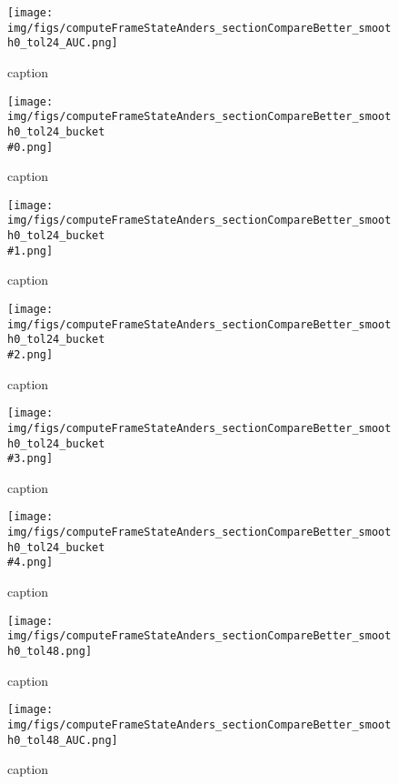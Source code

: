 %
\begin{figure}[!ht]
	\centering
	\texttt{[image: img/figs/computeFrameStateAnders\_sectionCompareBetter\_smooth0\_tol24\_AUC.png]}
	\caption{caption}
	\label{fig:computeFrameStateAnders_sectionCompareBetter_smooth0_tol24_AUC.png}
\end{figure}
%
\begin{figure}[!ht]
	\centering
	\texttt{[image: img/figs/computeFrameStateAnders\_sectionCompareBetter\_smooth0\_tol24\_bucket\\\#0.png]}
	\caption{caption}
	\label{fig:computeFrameStateAnders_sectionCompareBetter_smooth0_tol24_bucket\#0.png}
\end{figure}
%
\begin{figure}[!ht]
	\centering
	\texttt{[image: img/figs/computeFrameStateAnders\_sectionCompareBetter\_smooth0\_tol24\_bucket\\\#1.png]}
	\caption{caption}
	\label{fig:computeFrameStateAnders_sectionCompareBetter_smooth0_tol24_bucket\#1.png}
\end{figure}
%
\begin{figure}[!ht]
	\centering
	\texttt{[image: img/figs/computeFrameStateAnders\_sectionCompareBetter\_smooth0\_tol24\_bucket\\\#2.png]}
	\caption{caption}
	\label{fig:computeFrameStateAnders_sectionCompareBetter_smooth0_tol24_bucket\#2.png}
\end{figure}
%
\begin{figure}[!ht]
	\centering
	\texttt{[image: img/figs/computeFrameStateAnders\_sectionCompareBetter\_smooth0\_tol24\_bucket\\\#3.png]}
	\caption{caption}
	\label{fig:computeFrameStateAnders_sectionCompareBetter_smooth0_tol24_bucket\#3.png}
\end{figure}
%
\begin{figure}[!ht]
	\centering
	\texttt{[image: img/figs/computeFrameStateAnders\_sectionCompareBetter\_smooth0\_tol24\_bucket\\\#4.png]}
	\caption{caption}
	\label{fig:computeFrameStateAnders_sectionCompareBetter_smooth0_tol24_bucket\#4.png}
\end{figure}
%
\begin{figure}[!ht]
	\centering
	\texttt{[image: img/figs/computeFrameStateAnders\_sectionCompareBetter\_smooth0\_tol48.png]}
	\caption{caption}
	\label{fig:computeFrameStateAnders_sectionCompareBetter_smooth0_tol48.png}
\end{figure}
%
\begin{figure}[!ht]
	\centering
	\texttt{[image: img/figs/computeFrameStateAnders\_sectionCompareBetter\_smooth0\_tol48\_AUC.png]}
	\caption{caption}
	\label{fig:computeFrameStateAnders_sectionCompareBetter_smooth0_tol48_AUC.png}
\end{figure}
